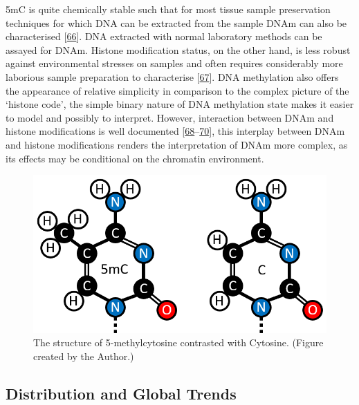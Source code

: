 \documentclass[
]{book}
\begin{document}
5mC is quite chemically stable such that for most tissue sample preservation techniques for which DNA can be extracted from the sample DNAm can also be characterised {[}\protect\hyperlink{ref-Briggs2010}{66}{]}.
DNA extracted with normal laboratory methods can be assayed for DNAm.
Histone modification status, on the other hand, is less robust against environmental stresses on samples and often requires considerably more laborious sample preparation to characterise {[}\protect\hyperlink{ref-Bauden2017}{67}{]}.
DNA methylation also offers the appearance of relative simplicity in comparison to the complex picture of the `histone code', the simple binary nature of DNA methylation state makes it easier to model and possibly to interpret.
However, interaction between DNAm and histone modifications is well documented {[}\protect\hyperlink{ref-Hashimshony2003}{68}--\protect\hyperlink{ref-Rose2014}{70}{]}, this interplay between DNAm and histone modifications renders the interpretation of DNAm more complex, as its effects may be conditional on the chromatin environment.

\begin{figure}

{\centering \includegraphics[width=0.8\linewidth]{figs/5mC_vs_C} 

}

\caption{The structure of 5-methylcytosine contrasted with Cytosine. (Figure created by the Author.)}\label{fig:5mCvsC}
\end{figure}



\hypertarget{IntroCpGdist}{%
\subsection{Distribution and Global Trends}\label{IntroCpGdist}}
\end{document}
